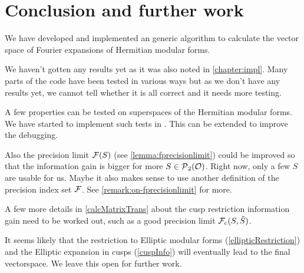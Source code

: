 
\section{Conclusion and further work}
\label{chapter:conclusion}

We have developed and implemented an generic algorithm to calculate the vector space of Fourier expansions of Hermitian modular forms.

We haven't gotten any results yet as it was also noted in \cref{chapter:impl}. Many parts of the code have been tested in various ways but as we don't have any results yet, we cannot tell whether it is all correct and it needs more testing.

A few properties can be tested on superspaces of the Hermitian modular forms. We have started to implement such tests in . This can be extended to improve the debugging.

Also the precision limit $\mathcal{F}(S)$ (see \cref{lemma:fprecisionlimit}) could be improved so that the information gain is bigger for more $S \in \operatorname{\mathcal{P}}_2(\mathcal{O})$. Right now, only a few $S$ are usable for us. Maybe it also makes sense to use another definition of the precision index set $\mathcal{F}$. See \cref{remark:on-fprecisionlimit} for more.

A few more details in \cref{calcMatrixTrans} about the cusp restriction information gain need to be worked out, such as a good precision limit $\mathcal{F}_c(S,\tilde{S})$.

It seems likely that the restriction to Elliptic modular forms (\cref{ellipticRestriction}) and the Elliptic expansion in cusps (\cref{cuspInfo}) will eventually lead to the final vectorspace. We leave this open for further work.
